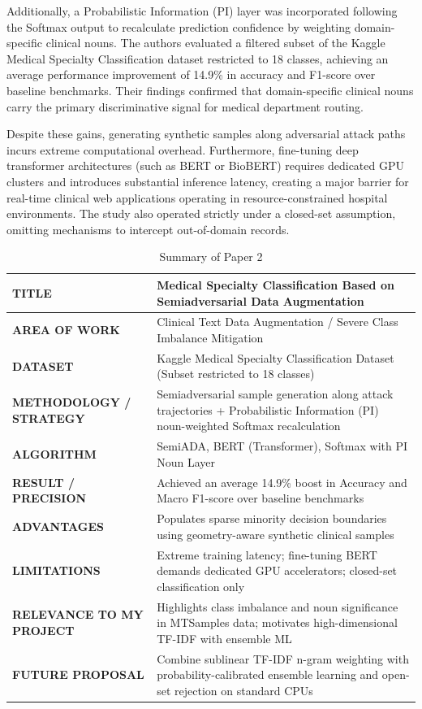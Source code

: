 Additionally, a Probabilistic Information (PI) layer was incorporated following the Softmax output to recalculate prediction confidence by weighting domain-specific clinical nouns. The authors evaluated a filtered subset of the Kaggle Medical Specialty Classification dataset restricted to 18 classes, achieving an average performance improvement of 14.9\% in accuracy and F1-score over baseline benchmarks. Their findings confirmed that domain-specific clinical nouns carry the primary discriminative signal for medical department routing.

Despite these gains, generating synthetic samples along adversarial attack paths incurs extreme computational overhead. Furthermore, fine-tuning deep transformer architectures (such as BERT or BioBERT) requires dedicated GPU clusters and introduces substantial inference latency, creating a major barrier for real-time clinical web applications operating in resource-constrained hospital environments. The study also operated strictly under a closed-set assumption, omitting mechanisms to intercept out-of-domain records.

\begin{table}[H]
\centering
\small
\setlength{\tabcolsep}{5pt}
\begin{tabularx}{\linewidth}{|>{\raggedright\arraybackslash}p{3.8cm}|>{\raggedright\arraybackslash}X|}
\hline
\textbf{TITLE} & Medical Specialty Classification Based on Semiadversarial Data Augmentation \cite{zhang2023} \\
\hline
\textbf{AREA OF WORK} & Clinical Text Data Augmentation / Severe Class Imbalance Mitigation \\
\hline
\textbf{DATASET} & Kaggle Medical Specialty Classification Dataset (Subset restricted to 18 classes) \\
\hline
\textbf{METHODOLOGY / STRATEGY} & Semiadversarial sample generation along attack trajectories + Probabilistic Information (PI) noun-weighted Softmax recalculation \\
\hline
\textbf{ALGORITHM} & SemiADA, BERT (Transformer), Softmax with PI Noun Layer \\
\hline
\textbf{RESULT / PRECISION} & Achieved an average 14.9\% boost in Accuracy and Macro F1-score over baseline benchmarks \\
\hline
\textbf{ADVANTAGES} & Populates sparse minority decision boundaries using geometry-aware synthetic clinical samples \\
\hline
\textbf{LIMITATIONS} & Extreme training latency; fine-tuning BERT demands dedicated GPU accelerators; closed-set classification only \\
\hline
\textbf{RELEVANCE TO MY PROJECT} & Highlights class imbalance and noun significance in MTSamples data; motivates high-dimensional TF-IDF with ensemble ML \\
\hline
\textbf{FUTURE PROPOSAL} & Combine sublinear TF-IDF n-gram weighting with probability-calibrated ensemble learning and open-set rejection on standard CPUs \\
\hline
\end{tabularx}
\caption{Summary of Paper 2}
\label{tab:summary_paper2}
\end{table}

